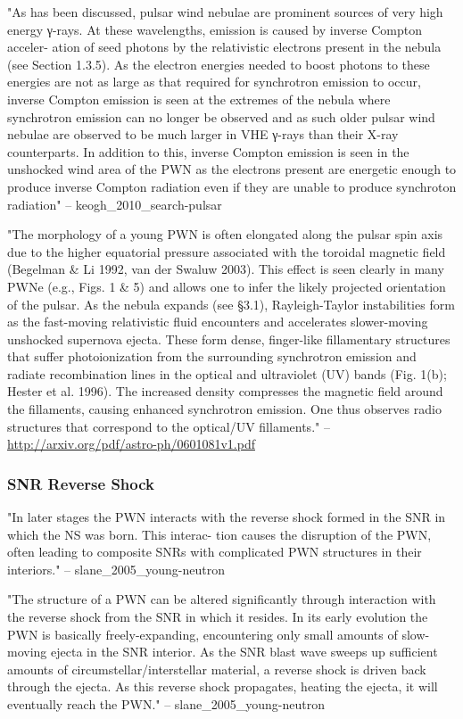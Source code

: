 

"As has been discussed, pulsar wind nebulae are prominent sources of
very high energy γ-rays. At these wavelengths, emission is caused
by inverse Compton acceler- ation of seed photons by the relativistic
electrons present in the nebula (see Section 1.3.5). As the electron
energies needed to boost photons to these energies are not as large as
that required for synchrotron emission to occur, inverse Compton emission
is seen at the extremes of the nebula where synchrotron emission can no
longer be observed and as such older pulsar wind nebulae are observed to
be much larger in VHE γ-rays than their X-ray counterparts. In addition
to this, inverse Compton emission is seen in the unshocked wind area of
the PWN as the electrons present are energetic enough to produce inverse
Compton radiation even if they are unable to produce synchroton radiation"
-- keogh\_2010\_search-pulsar


"The morphology of a young PWN is often elongated along the pulsar spin
axis due to the higher equatorial pressure associated with the toroidal
magnetic field (Begelman \& Li 1992, van der Swaluw 2003). This effect
is seen clearly in many PWNe (e.g., Figs. 1 \& 5) and allows one to infer
the likely projected orientation of the pulsar. As the nebula expands (see
§3.1), Rayleigh-Taylor instabilities form as the fast-moving relativistic
fluid encounters and accelerates slower-moving unshocked supernova
ejecta. These form dense, finger-like fillamentary structures that suffer
photoionization from the surrounding synchrotron emission and radiate
recombination lines in the optical and ultraviolet (UV) bands (Fig. 1(b);
Hester et al. 1996). The increased density compresses the magnetic ﬁeld
around the fillaments, causing enhanced synchrotron emission. One
thus observes radio structures that correspond to the optical/UV
fillaments." -- \url{http://arxiv.org/pdf/astro-ph/0601081v1.pdf}

\subsubsection{SNR Reverse Shock}
"In later stages the PWN interacts with the reverse shock formed in the
SNR in which the NS was born. This interac- tion causes the disruption of
the PWN, often leading to composite SNRs with complicated PWN structures
in their interiors." -- slane\_2005\_young-neutron

"The structure of a PWN can be altered significantly through interaction
with the reverse shock from the SNR in which it resides. In its early
evolution the PWN is basically freely-expanding, encountering only small
amounts of slow- moving ejecta in the SNR interior. As the SNR blast
wave sweeps up sufficient amounts of circumstellar/interstellar material,
a reverse shock is driven back through the ejecta. As this reverse shock
propagates, heating the ejecta, it will eventually reach the PWN."
-- slane\_2005\_young-neutron
